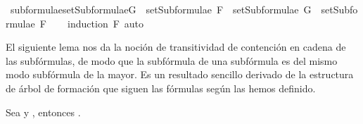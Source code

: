 \begin{isabellebody}
\ subformulae{\isacharunderscore}setSubformulae{\isacharcolon}{\isachardoublequoteopen}G\ {\isasymin}\ setSubformulae\ F\ {\isasymLongrightarrow}\ setSubformulae\ G\ {\isasymsubseteq}\ setSubformulae\ F{\isachardoublequoteclose}\isanewline
%
\isadelimproof
\ \ %
\endisadelimproof
%
\isatagproof
{}\isamarkupfalse%
\ {\isacharparenleft}induction\ F{\isacharparenright}\ auto%
\endisatagproof
{\isafoldproof}%
%
\isadelimproof
%
\endisadelimproof
%
\begin{isamarkuptext}%
El siguiente lema nos da la noción de transitividad de contención en cadena de las subfórmulas, 
de modo que la subfórmula de una subfórmula es del mismo modo subfórmula de la mayor. 
Es un resultado sencillo derivado de la estructura de árbol de formación que siguen las fórmulas 
según las hemos definido.

\begin{lema}
    Sea  y , entonces .
  \end{lema}


\end{isamarkuptext}
\end{isabellebody}
